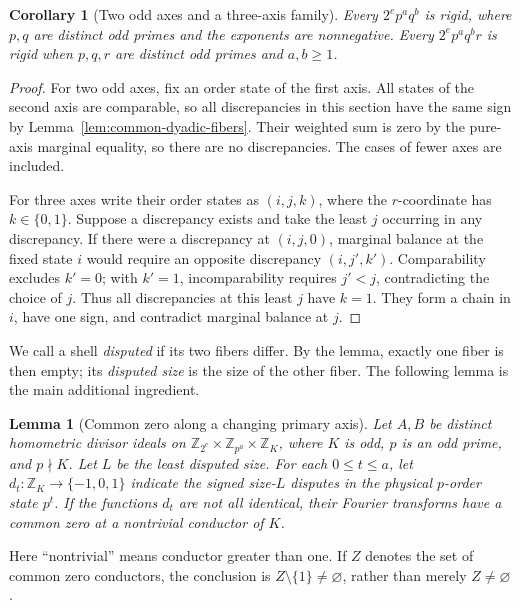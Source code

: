 \documentclass[11pt]{article}
\numberwithin{equation}{section}
\newtheorem{lemma}[theorem]{Lemma}
\newtheorem{corollary}[theorem]{Corollary}
\theoremstyle{definition}
\theoremstyle{remark}
\begin{document}
\begin{corollary}[Two odd axes and a three-axis family]
\label{cor:two-odd-axes}
Every \(2^ep^aq^b\) is rigid, where \(p,q\) are distinct odd primes
and the exponents are nonnegative. Every \(2^ep^aq^br\) is rigid
when \(p,q,r\) are distinct odd primes and \(a,b\ge1\).
\end{corollary}

\begin{proof}
For two odd axes, fix an order state of the first axis. All states of
the second axis are comparable, so all discrepancies in this section
have the same sign by Lemma~\ref{lem:common-dyadic-fibers}. Their
weighted sum is zero by the pure-axis marginal equality, so there are
no discrepancies. The cases of fewer axes are included.

For three axes write their order states as \((i,j,k)\), where the
\(r\)-coordinate has \(k\in\{0,1\}\). Suppose a discrepancy exists
and take the least \(j\) occurring in any discrepancy. If there were
a discrepancy at \((i,j,0)\), marginal balance at the fixed state
\(i\) would require an opposite discrepancy \((i,j',k')\).
Comparability excludes \(k'=0\); with \(k'=1\), incomparability
requires \(j'<j\), contradicting the choice of \(j\). Thus all
discrepancies at this least \(j\) have \(k=1\). They form a chain
in \(i\), have one sign, and contradict marginal balance at \(j\).
\end{proof}

We call a shell \emph{disputed} if its two fibers differ. By the lemma,
exactly one fiber is then empty; its \emph{disputed size} is the size
of the other fiber. The following lemma is the main additional ingredient.

\begin{lemma}[Common zero along a changing primary axis]
\label{lem:primary-common-zero}
Let \(A,B\) be distinct homometric divisor ideals on
\(\mathbb Z_{2^e}\times\mathbb Z_{p^a}\times\mathbb Z_K\), where
\(K\) is odd, \(p\) is an odd prime, and \(p\nmid K\). Let \(L\)
be the least disputed size. For each \(0\le t\le a\), let
\(d_t:\mathbb Z_K\to\{-1,0,1\}\) indicate the signed size-\(L\)
disputes in the physical \(p\)-order state \(p^t\). If the functions
\(d_t\) are not all identical, their Fourier transforms have a common
zero at a nontrivial conductor of \(K\).
\end{lemma}

Here ``nontrivial'' means conductor greater than one. If \(Z\) denotes
the set of common zero conductors, the conclusion is
\(Z\setminus\{1\}\ne\varnothing\), rather than merely
\(Z\ne\varnothing\).
\end{document}
